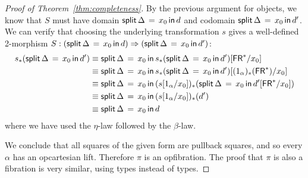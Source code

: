 \documentclass[a4paper,USenglish,numberwithinsect]{lipics-v2016}
\newcommand\D{\ensuremath{d}} %
\newcommand\deq{\ensuremath{\equiv}}
\newcommand\spr{\ensuremath{\Rightarrow}} %
\newcommand\FR{\dsd{FR}}
\newcommand\FLd[3]{\ensuremath{\dsd{split} \, #2 \, = \, {#1} \, \dsd{in} \, #3}}
\newcommand\Cut[3]{\ensuremath{#1[#2/#3]}}
\newcommand\FRs{\ensuremath{\FR^*}}
\begin{document}
\begin{proof}[Proof of Theorem~\ref{thm:completeness}]
By the previous argument for objects, we know that $S$ must have domain
$\FLd{x_0}{\Delta}{\D}$ and codomain $\FLd{x_0}{\Delta}{\D'}$. We can
verify that choosing the underlying transformation $s$ gives a
well-defined 2-morphism $S : (\FLd{x_0}{\Delta}{\D}) \spr
(\FLd{x_0}{\Delta}{\D'})$:
\begin{align*}
s_*( \FLd{x_0}{\Delta}{\D'}) &\deq \FLd{x_0}{\Delta}{\Cut{s_*( \FLd{x_0}{\Delta}{\D'})}{\FRs}{x_0}}\\
&\deq \FLd{x_0}{\Delta}{\Cut{s_*( \FLd{x_0}{\Delta}{\D'})}{(1_\alpha)_*(\FRs)}{x_0}}\\
&\deq \FLd{x_0}{\Delta}{(\Cut{s}{1_\alpha}{x_0})_*(\Cut{\FLd{x_0}{\Delta}{\D'}}{\FRs}{x_0})}\\
&\deq \FLd{x_0}{\Delta}{(\Cut{s}{1_\alpha}{x_0})_*(\D') }\\
&\deq \FLd{x_0}{\Delta}{\D}
\end{align*}
where we have used the $\eta$-law followed by the $\beta$-law. 

We conclude that all squares of the given form are pullback squares, and
so every $\alpha$ has an opcartesian lift. Therefore $\pi$ is an
opfibration.  The proof that  $\pi$ is also a fibration is very similar,
using  types instead of  types. 
\end{proof}
\end{document}
